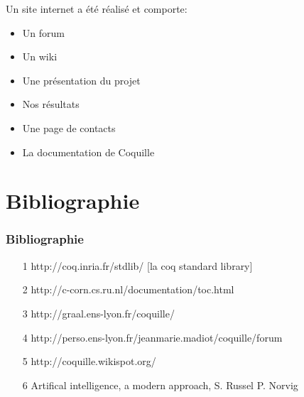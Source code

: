 \documentclass[slidetop]{beamer}
\begin{document}
\begin{frame}
Un site internet a été réalisé et comporte:
\begin{itemize}
    \item Un forum 
    \item Un wiki
    \item Une présentation du projet 
    \item Nos résultats
    \item Une page de contacts
    \item La documentation de Coquille %
\end{itemize}


\end{frame}



\section{Bibliographie}
\begin{frame}
\frametitle{Bibliographie} 

 \begin{itemize}
\item [1] http://coq.inria.fr/stdlib/ [la coq standard library]
\item [2] http://c-corn.cs.ru.nl/documentation/toc.html%
\item [3] http://graal.ens-lyon.fr/coquille/
\item [4] http://perso.ens-lyon.fr/jeanmarie.madiot/coquille/forum %
\item [5] http://coquille.wikispot.org/ %
\item [6] Artifical intelligence, a modern approach, S. Russel P. Norvig

\end{itemize}
\end{frame}


 
\end{document}
